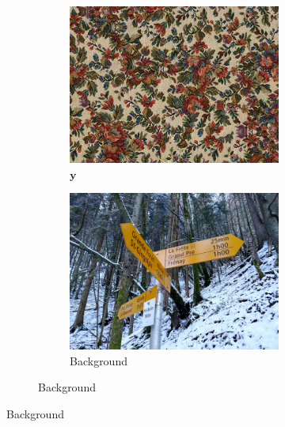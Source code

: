 \begin{figure}[]
    \centering    
    \begin{subfigure}{\textwidth}
        \centering
        \begin{subfigure}{0.24\textwidth}
            \centering
            \includegraphics[width=\textwidth]{images/04-experiment02/photo/flowers/target.jpg}
            \caption*{\(\bm{y}\)}
        \end{subfigure}
        \hfill
        \begin{subfigure}{0.24\textwidth}
            \centering
            \includegraphics[width=\textwidth]{images/04-experiment02/photo/bg.jpg}
            \caption*{Background}

\end{subfigure}
\end{subfigure}
\end{figure}

